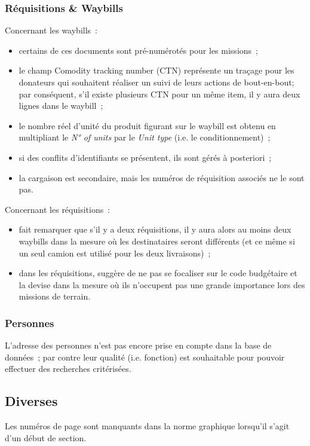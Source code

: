 \documentclass[11pt,fleqn]{report}
\begin{document}
\subsubsection{Réquisitions \& Waybills}
Concernant les waybills~:
\begin{itemize}
	\item certains de ces documents sont pré-numérotés pour les missions~;
	\item le champ \og{}Comodity tracking number\fg{} (CTN) représente un traçage pour les donateurs qui souhaitent réaliser un suivi de leurs actions de bout-en-bout; par conséquent, s'il existe plusieurs CTN pour un même item, il y aura deux lignes dans le waybill~;
	\item le nombre réel d'unité du produit figurant sur le waybill est obtenu en multipliant le \emph{N° of units} par le \emph{Unit type} (i.e. le conditionnement)~;
	\item si des conflits d'identifiants se présentent, ils sont gérés à posteriori~;
	\item la cargaison est secondaire, mais les numéros de réquisition associés ne le sont pas.
\end{itemize}
Concernant les réquisitions~:
\begin{itemize}
	\item \mo fait remarquer que s'il y a deux réquisitions, il y aura alors au moins deux waybills dans la mesure où les destinataires seront différents (et ce même si un seul camion est utilisé pour les deux livraisons)~;
	\item dans les réquisitions, \mo suggère de ne pas se focaliser sur le code budgétaire et la devise dans la mesure où ils n'occupent pas une grande importance lors des missions de terrain.
\end{itemize}

\subsubsection{Personnes}
L'adresse des personnes n'est pas encore prise en compte dans la base de données~; par contre leur qualité (i.e. fonction) est souhaitable pour pouvoir effectuer des recherches critérisées.

\subsection{Diverses}
Les numéros de page sont manquants dans la norme graphique lorsqu'il s'agit d'un début de section.
\end{document}
